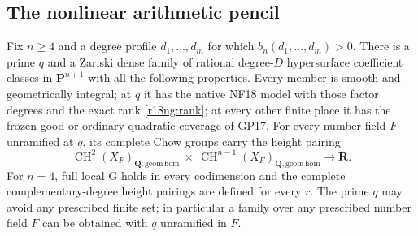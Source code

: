\subsection{The nonlinear arithmetic pencil}

\begin{theorem}
\label{r18ng:global}
Fix $n\ge4$ and a degree profile $d_1,\ldots,d_m$ for
which $b_n(d_1,\ldots,d_m)>0$.  There is a prime $q$
and a Zariski dense family of rational degree-$D$
hypersurface coefficient classes in $\mathbf P^{n+1}$
with all the following properties.
Every member is smooth and geometrically integral;
at $q$ it has the native NF18 model with those factor
degrees and the exact rank \eqref{r18ng:rank}; at every
other finite place it has the frozen good or
ordinary-quadratic coverage of GP17.  For every number
field $F$ unramified at $q$, its complete Chow groups
carry the height pairing
\[
 \operatorname{CH}^2(X_F)_{\mathbf Q,\mathrm{geom\,hom}}
 \ \times\
 \operatorname{CH}^{n-1}(X_F)_{\mathbf Q,\mathrm{geom\,hom}}
                   \longrightarrow\mathbf R.
 \tag{NG18.6}\label{r18ng:height}
\]
For $n=4$, full local G holds in every codimension and
the complete complementary-degree height pairings
are defined for every $r$.  The prime $q$ may avoid
any prescribed finite set; in particular a family
over any prescribed number field $F$ can be obtained
with $q$ unramified in $F$.
\end{theorem}

